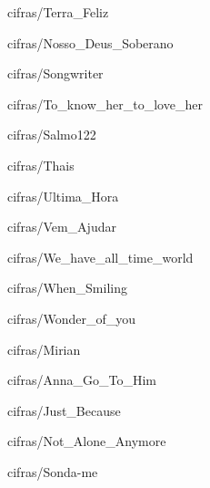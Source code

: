 \documentclass{scrartcl}
\begin{document}

{cifras/Terra_Feliz}


{cifras/Nosso_Deus_Soberano}


{cifras/Songwriter}


{cifras/To_know_her_to_love_her}


{cifras/Salmo122}


{cifras/Thais}


{cifras/Ultima_Hora}


{cifras/Vem_Ajudar}


{cifras/We_have_all_time_world}


{cifras/When_Smiling}


{cifras/Wonder_of_you}


{cifras/Mirian}


{cifras/Anna_Go_To_Him}


{cifras/Just_Because}


{cifras/Not_Alone_Anymore}


{cifras/Sonda-me}
\end{document}
